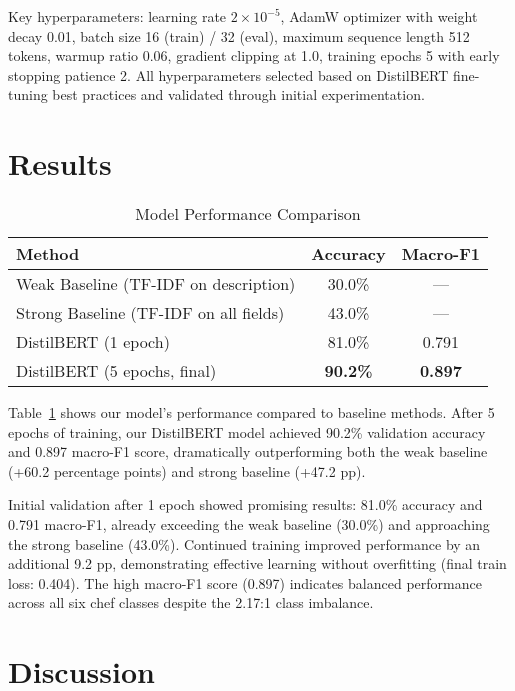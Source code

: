 \documentclass[twocolumn,10pt]{article}
\begin{document}
Key hyperparameters: learning rate $2 \times 10^{-5}$, AdamW optimizer with weight decay 0.01, batch size 16 (train) / 32 (eval), maximum sequence length 512 tokens, warmup ratio 0.06, gradient clipping at 1.0, training epochs 5 with early stopping patience 2. All hyperparameters selected based on DistilBERT fine-tuning best practices and validated through initial experimentation.

\section{Results}

\begin{table}[h]
\centering
\caption{Model Performance Comparison}
\begin{tabular}{lcc}
\hline
\textbf{Method} & \textbf{Accuracy} & \textbf{Macro-F1} \\
\hline
Weak Baseline (TF-IDF on description) & 30.0\% & --- \\
Strong Baseline (TF-IDF on all fields) & 43.0\% & --- \\
\hline
DistilBERT (1 epoch) & 81.0\% & 0.791 \\
DistilBERT (5 epochs, final) & \textbf{90.2\%} & \textbf{0.897} \\
\hline
\end{tabular}
\label{tab:results}
\end{table}

Table~\ref{tab:results} shows our model's performance compared to baseline methods. After 5 epochs of training, our DistilBERT model achieved 90.2\% validation accuracy and 0.897 macro-F1 score, dramatically outperforming both the weak baseline (+60.2 percentage points) and strong baseline (+47.2 pp).

Initial validation after 1 epoch showed promising results: 81.0\% accuracy and 0.791 macro-F1, already exceeding the weak baseline (30.0\%) and approaching the strong baseline (43.0\%). Continued training improved performance by an additional 9.2 pp, demonstrating effective learning without overfitting (final train loss: 0.404). The high macro-F1 score (0.897) indicates balanced performance across all six chef classes despite the 2.17:1 class imbalance.


\section{Discussion}
\end{document}
